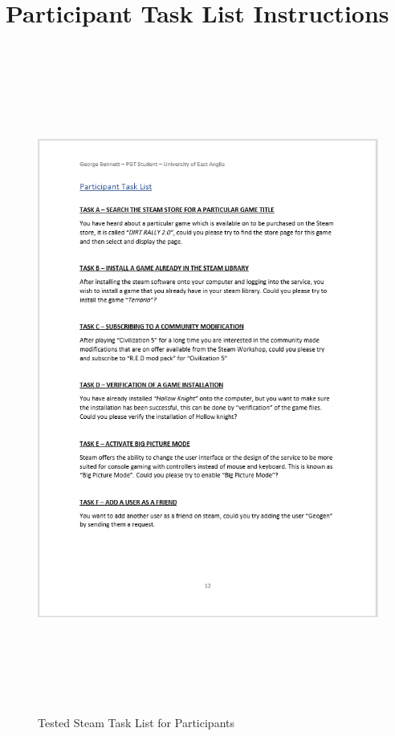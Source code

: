 \section{Participant Task List Instructions}
\begin{figure}[H]
\includegraphics[width=16cm,height=22cm]{Screenshots/StudyMaterialScreenshots/taskForParticipants.png}
\caption{Tested Steam Task List for Participants}
\end{figure}

